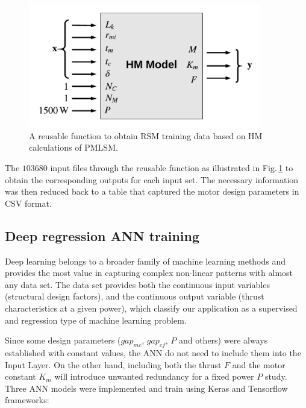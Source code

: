         
            \begin{figure}
                \centering
                \includegraphics[width=4in]{chap4/images/HM_mining_for_PMLSM.pdf}
                \caption{A reusable function to obtain \acs{RSM} training data based on \ac{HM} calculations of \ac{PMLSM}.}
                \label{fig:chapter/rsm/PMLSM/mining process}
            \end{figure}
            
            
            The $103680$ input files through the reusable function as illustrated in Fig.\,\ref{fig:chapter/rsm/PMLSM/mining process} to obtain the corresponding outputs for each input set. The necessary information was then reduced back to a table that captured the motor design parameters in CSV format. 
            
        
        \subsection{Deep regression ANN training}   \label{Chapter:RSM/PMLSM/ANN training}
        
            
            Deep learning belongs to a broader family of machine learning methods and provides the most value in capturing complex non-linear patterns with almost any data set. The data set provides both the continuous input variables (structural design factors), and the continuous output variable (thrust characteristics at a given power), which classify our application as a supervised and regression type of machine learning problem.
            
            
            Since some design parameters ($gap_{mc}$, $gap_{cf}$, $P$ and others) were always established with constant values, the \acs{ANN} do not need to include them into the Input Layer. On the other hand, including both the thrust $F$ and the motor constant $K_m$ will introduce unwanted redundancy for a fixed power $P$ study. Three \acs{ANN} models were implemented and train using Keras and Tensorflow frameworks:
            
